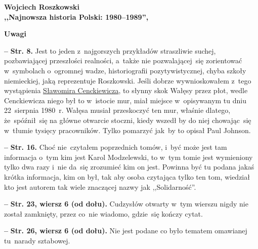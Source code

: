 \documentclass[a4paper,11pt]{article}
\newcommand{\spaceFour}{0.5em}
\newcommand{\tb}{\textbf}
\newcommand{\noi}{\noindent}
\newcommand{\start}{\noi \tb{--} {}}
\newcommand{\Center}[1]{\begin{center} #1 \end{center}}
\newcommand{\CenterTB}[1]{\Center{\tb{#1}}}
\newcommand{\Str}[1]{\tb{Str. #1.}}
\newcommand{\StrWd}[2]{\tb{Str. #1, wiersz #2 (od dołu).}}
\newcommand{\Work}[1]{ \begin{center} {\large \tb{#1}} \end{center} }
\begin{document}
\Work{
  Wojciech Roszkowski \\
  ,,Najnowsza historia Polski: 1980--1989'',
  \cite{RoszkowskiNajnowszaHistoriaPolski80-89Wyd11} }


\CenterTB{Uwagi}

\start \Str{8} Jest to jeden z~najgorszych przykładów straszliwie
suchej, pozbawiającej przeszłości realności, a~także nie
pozwalającej~się zorientować w~symbolach o~ogromnej wadze,
historiografii pozytywistycznej, chyba szkoły niemieckiej, jaką
reprezentuje Roszkowski. Jeśli dobrze wywnioskowałem z~tego
wystąpienia
\href{https://www.youtube.com/watch?v=6B93_3CCMac}{Sławomira
  Cenckiewicza}, to słynny skok Wałęsy przez płot, wedle Cenckiewicza
niego był to w~istocie mur, miał miejsce w~opisywanym tu dniu
22~sierpnia 1980~r. Wałęsa musiał przeskoczyć ten mur, właśnie
dlatego, że~spóźnił~się na główne otwarcie stoczni, kiedy wszedł by do
niej chowając~się w~tłumie tysięcy pracowników. Tylko pomarzyć jak~by
to opisał Paul Johnson.

\vspace{\spaceFour}


\start \Str{16} Choć nie~czytałem poprzednich tomów, i~być może jest
tam informacja o~tym kim jest Karol Modzelewski, to w~tym tomie jest
wymieniony tylko dwa razy i~nie da~się zrozumieć kim on jest. Powinna
być tu podana jakaś krótka informacja, kim on był, tak aby osoba
czytająca tylko ten tom, wiedział kto jest autorem tak wiele znaczącej
nazwy jak ,,Solidarność''.

\vspace{\spaceFour}


\start \StrWd{23}{6} Cudzysłów otwarty w~tym wierszu nigdy nie został
zamknięty, przez co~nie wiadomo, gdzie~się kończy cytat.

\vspace{\spaceFour}


\start \StrWd{26}{6} Nie jest podane co było tematem omawianej
tu~narady sztabowej.


\end{document}
